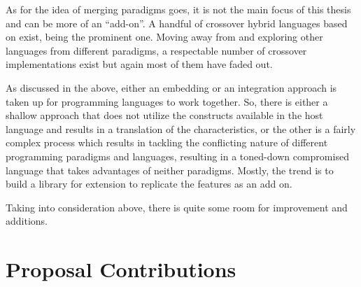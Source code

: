\documentclass[thesis-solanki.tex]{subfiles}
\begin{document}
As for the idea of merging paradigms goes, it is not the main focus of this thesis and can be more of an
``add-on''. A handful of crossover hybrid languages based on  exist,
 \cite{website:curry} being the prominent one.
Moving away from  and exploring other languages from different paradigms, a respectable number of
crossover implementations exist but again most of them have faded out.

As discussed in the above,
either an embedding or an integration approach is taken up for programming languages to work together.
So, there is either a shallow approach that does not utilize the constructs available in the host language and
results in a translation of the characteristics, or the other is a fairly complex process which results in tackling
the conflicting nature of different programming paradigms and languages, resulting in a toned-down compromised
language that takes advantages of neither paradigms.
Mostly, the trend is to build a library for extension to replicate the features as an add on.

Taking into consideration above, there is quite some room for improvement and additions.
\section{Proposal Contributions}
\end{document}
